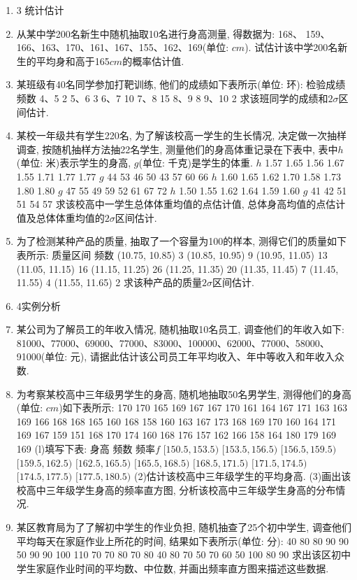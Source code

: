 \documentclass[10pt,a4paper]{article}
\begin{document}
\begin{enumerate}[1.]
\item 3  统计估计
\item 从某中学200名新生中随机抽取10名进行身高测量, 得数据为: 168、 159、166、163、170、161、167、155、162、169(单位: $cm$). 试估计该中学200名新生的平均身和高于165$cm$的概率估计值.
\item 某班级有40名同学参加打靶训练, 他们的成绩如下表所示(单位: 环):
检验成绩	频数
4、5	2
5、6	3
6、7	10
7、8	15
8、9	8
9、10	2
求该班同学的成绩和$2\sigma$区间估计.
\item 某校一年级共有学生220名, 为了解该校高一学生的生长情况, 决定做一次抽样调查, 按随机抽样方法抽22名学生, 测量他们的身高体重记录在下表中, 表中$h$(单位: 米)表示学生的身高, $g$(单位: 千克)是学生的体重.
$h$	1.57	1.65	1.56	1.67	1.55	1.71	1.77	1.77
$g$	44	53	46	50	43	57	60	66
$h$	1.60	1.65	1.62	1.70	1.58	1.73	1.80	1.80
$g$	47	55	49	59	52	61	67	72
$h$	1.50	1.55	1.62	1.64	1.59	1.60		
$g$	41	42	51	51	54	57		
求该校高中一学生总体体重均值的点估计值, 总体身高均值的点估计值及总体体重均值的$2\sigma$区间估计.
\item 为了检测某种产品的质量, 抽取了一个容量为100的样本, 测得它们的质量如下表所示:
质量区间	频数
(10.75, 10.85)	3
(10.85, 10.95)	9
(10.95, 11.05)	13
(11.05, 11.15)	16
(11.15, 11.25)	26
(11.25, 11.35)	20
(11.35, 11.45)	7
(11.45, 11.55)	4
(11.55, 11.65)	2
求该种产品的质量$2\sigma$区间估计.
\item 4实例分析
\item 某公司为了解员工的年收入情况, 随机抽取10名员工, 调查他们的年收入如下: 81000、77000、69000、77000、83000、100000、62000、77000、58000、91000(单位: 元), 请据此估计该公司员工年平均收入、年中等收入和年收入众数.
\item 为考察某校高中三年级男学生的身高, 随机地抽取50名男学生, 测得他们的身高(单位: $cm$)如下表所示:
170	170	165	169	167	167	170	161	164	167
171	163	163	169	166	168	168	165	160	168
158	160	163	167	173	168	169	170	160	164
171	169	167	159	151	168	170	174	160	168
176	157	162	166	158	164	180	179	169	169
(l)填写下表:
身高	频数	频率$f$
$[150.5,153.5)$		
$[153.5,156.5)$		
$[156.5,159.5)$		
$[159.5,162.5)$		
$[162.5,165.5)$		
$[165.5,168.5)$		
$[168.5,171.5)$		
$[171.5,174.5)$		
$[174.5,177.5)$		
$[177.5,180.5)$		
(2)估计该校高中三年级学生的平均身高.
(3)画出该校高中三年级学生身高的频率直方图, 分析该校高中三年级学生身高的分布情况.
\item 某区教育局为了了解初中学生的作业负担, 随机抽查了25个初中学生, 调查他们平均每天在家庭作业上所花的时间, 结果如下表所示(单位: 分):
40	80	80	90	90
50	90	90	100	110
70	70	80	70	80
40	80	70	50	70
60	50	100	80	90
求出该区初中学生家庭作业时间的平均数、中位数, 并画出频率直方图来描述这些数据.

\end{enumerate}
\end{document}
